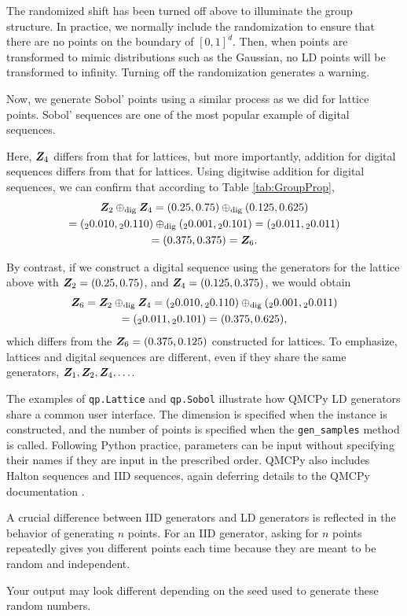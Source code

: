\documentclass[graybox,footinfo]{svmult}
\newcommand{\dig}{\textup{dig}}
\begin{document}
The randomized shift has been turned off above to illuminate the group structure.  In practice, we normally include the randomization to ensure that there are no points on the boundary of $[0,1]^d$.  Then, when points are transformed to mimic distributions such as the Gaussian, no LD points will be transformed to infinity.  Turning off the randomization generates a warning.

Now, we generate Sobol' points using a similar process as we did for lattice points.  Sobol' sequences are one of the most popular example of digital sequences.

Here, ${\boldsymbol{Z}}_4$ differs from that for lattices, but more importantly, addition for digital sequences differs from that for lattices.  Using digitwise addition for digital sequences, we can confirm that according to Table \ref{tab:GroupProp},
\begin{multline*}
\bsZ_2 \oplus_{\dig} \bsZ_4 = (0.25,0.75)  \oplus_{\dig} (0.125,0.625) \\
=  ({}_20.010,{}_20.110)  \oplus_{\dig} ({}_20.001,{}_20.101) = ({}_20.011,{}_20.011) \\
= (0.375,0.375) = \bsZ_6.
\end{multline*}

By contrast, if we construct a digital sequence using the generators for the lattice above with ${\boldsymbol{Z}}_2 = (0.25, 0.75)$, and ${\boldsymbol{Z}}_4 = (0.125, 0.375)$, we would obtain
\begin{multline*}
\bsZ_6 = \bsZ_2 \oplus_{\dig} \bsZ_4   = ({}_20.010,{}_20.110)  \oplus_{\dig} ({}_20.001,{}_20.011)  \\
= ({}_20.011,{}_20.101) = (0.375, 0.625),
\end{multline*}
which differs from the ${\boldsymbol{Z}}_6=(0.375, 0.125)$ constructed for lattices.  To emphasize, lattices and digital sequences are different, even if they share the same generators, ${\boldsymbol{Z}}_1, {\boldsymbol{Z}}_2, {\boldsymbol{Z}}_4, \ldots$.

The examples of \texttt{qp.Lattice} and \texttt{qp.Sobol} illustrate how QMCPy LD generators share a common user interface.  The dimension is specified when the instance is constructed, and the number of points is specified when the \texttt{gen\_samples} method is called.  Following Python practice, parameters can be input without specifying their names if they are input in the prescribed order.  QMCPy also includes Halton sequences and IID sequences, again deferring details to the QMCPy documentation \cite{QMCPyDocs}.

A crucial difference between IID generators and LD generators is reflected in the behavior of generating $n$ points.  For an IID generator, asking for $n$ points repeatedly gives you different points each time because they are meant to be random and independent.

Your output may look different depending on the seed used to generate these random numbers.
\end{document}
